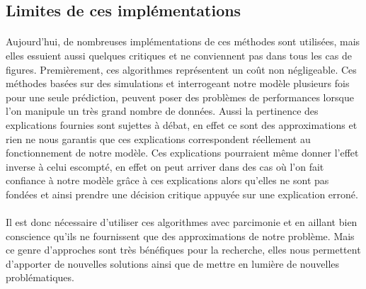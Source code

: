 \subsection{Limites de ces implémentations}
\paragraph{}Aujourd'hui, de nombreuses implémentations de ces méthodes sont utilisées, mais elles essuient aussi quelques critiques et ne conviennent pas dans tous les cas de figures. Premièrement, ces algorithmes représentent un coût non négligeable. Ces méthodes basées sur des simulations et interrogeant notre modèle plusieurs fois pour une seule prédiction, peuvent poser des problèmes de performances lorsque l'on manipule un très grand nombre de données. Aussi la pertinence des explications fournies sont sujettes à débat, en effet ce sont des approximations et rien ne nous garantis que ces explications correspondent réellement au fonctionnement de notre modèle. Ces explications pourraient même donner l'effet inverse à celui escompté, en effet on peut arriver dans des cas où l'on fait confiance à notre modèle grâce à ces explications alors qu'elles ne sont pas fondées et ainsi prendre une décision critique appuyée sur une explication erroné.

\paragraph{}Il est donc nécessaire d'utiliser ces algorithmes avec parcimonie et en aillant bien conscience qu'ils ne fournissent que des approximations de notre problème. Mais ce genre d'approches sont très bénéfiques pour la recherche, elles nous permettent d'apporter de nouvelles solutions ainsi que de mettre en lumière de nouvelles problématiques.
